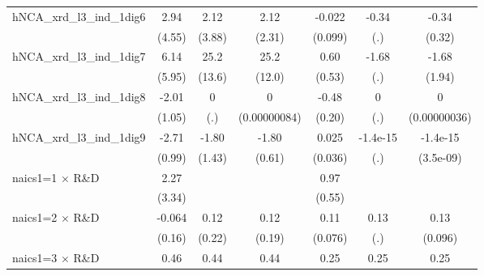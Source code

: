 {\begin{tabular}{l*{6}{c}}
hNCA\_xrd\_l3\_ind\_1dig6&        2.94         &        2.12         &        2.12         &      -0.022         &       -0.34         &       -0.34         \\
                    &      (4.55)         &      (3.88)         &      (2.31)         &     (0.099)         &         (.)         &      (0.32)         \\
\addlinespace
hNCA\_xrd\_l3\_ind\_1dig7&        6.14         &        25.2\sym{*}  &        25.2\sym{**} &        0.60         &       -1.68         &       -1.68         \\
                    &      (5.95)         &      (13.6)         &      (12.0)         &      (0.53)         &         (.)         &      (1.94)         \\
\addlinespace
hNCA\_xrd\_l3\_ind\_1dig8&       -2.01\sym{*}  &           0         &           0         &       -0.48\sym{**} &           0         &           0         \\
                    &      (1.05)         &         (.)         &(0.00000084)         &      (0.20)         &         (.)         &(0.00000036)         \\
\addlinespace
hNCA\_xrd\_l3\_ind\_1dig9&       -2.71\sym{***}&       -1.80         &       -1.80\sym{***}&       0.025         &    -1.4e-15         &    -1.4e-15         \\
                    &      (0.99)         &      (1.43)         &      (0.61)         &     (0.036)         &         (.)         &   (3.5e-09)         \\
\addlinespace
naics1=1 $\times$ R\&D&        2.27         &                     &                     &        0.97\sym{*}  &                     &                     \\
                    &      (3.34)         &                     &                     &      (0.55)         &                     &                     \\
\addlinespace
naics1=2 $\times$ R\&D&      -0.064         &        0.12         &        0.12         &        0.11         &        0.13         &        0.13         \\
                    &      (0.16)         &      (0.22)         &      (0.19)         &     (0.076)         &         (.)         &     (0.096)         \\
\addlinespace
naics1=3 $\times$ R\&D&        0.46\sym{***}&        0.44\sym{***}&        0.44\sym{***}&        0.25\sym{***}&        0.25         &        0.25\sym{***}\\

\end{tabular}}
